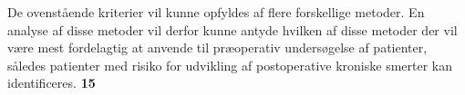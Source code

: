 De ovenstående kriterier vil kunne opfyldes af flere forskellige metoder. En analyse af disse metoder vil derfor kunne antyde hvilken af disse metoder der vil være mest fordelagtig at anvende til præoperativ undersøgelse af patienter, således patienter med risiko for udvikling af postoperative kroniske smerter kan identificeres. \textbf{15}        

